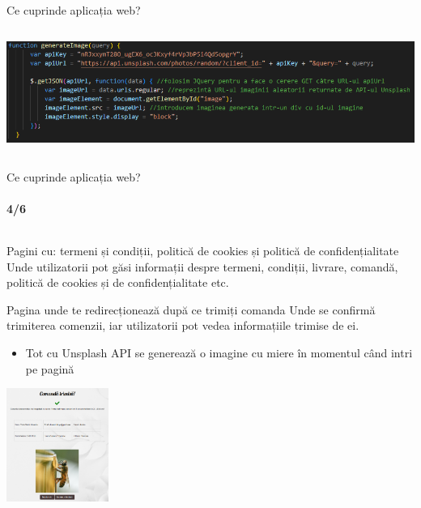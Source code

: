 \documentclass{beamer}
\begin{document}
\begin{darkframes}
\begin{frame}[label=math]{Ce cuprinde aplicația web?}
\begin{columns}[t]
\begin{column}{1\textwidth}
\begin{center}
						\begin{minipage}[t]{0.6\textwidth}
							\centering
							\includegraphics[width=\textwidth]{codgenerator.png}
						\end{minipage}
					\end{center}
				\end{column}
			\end{columns}
		\end{frame}
		
		
		
		\begin{frame}[label=math]{Ce cuprinde aplicația web?}
			\vspace{-1em}
			\framesubtitle{4/6}
			\begin{columns}[t]
				\begin{column}{1\textwidth}
					\begin{exampleblock}{Pagini cu: termeni și condiții, politică de cookies și politică de confidențialitate}
						\tiny Unde utilizatorii pot găsi informații despre \alert{termeni, condiții, livrare, comandă, politică de cookies și de confidențialitate etc.}
					\end{exampleblock}
					\begin{exampleblock}{Pagina unde te redirecționează după ce trimiți comanda}
						\tiny Unde se \alert{confirmă trimiterea comenzii}, iar utilizatorii pot vedea informațiile trimise de ei.
						\begin{itemize}
							\item Tot cu Unsplash API se generează o imagine cu miere în momentul când intri pe pagină 
						\end{itemize}
					\end{exampleblock}
					\vspace{-1em}
					\begin{center}
						\includegraphics[width=0.25\textwidth]{comandatrimisa.png}
					\end{center}
				\end{column}
			\end{columns}
		\end{frame}
		

\end{darkframes}
\end{document}
